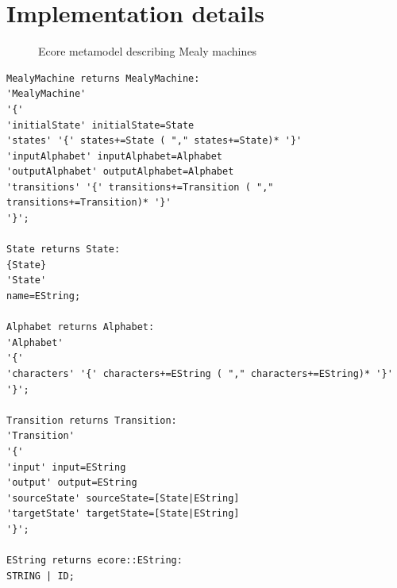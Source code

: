 \clearpage
\chapter{Implementation details}

\begin{figure}[!ht] 
	\centering
	\caption{Ecore metamodel describing Mealy machines} 
	\label{fig_appendix_mealyecor}
\end{figure}

\begin{lstlisting}[caption=Xtext grammar describing Mealy machines.,label=li:appendix_xtext,float,floatplacement=H]
MealyMachine returns MealyMachine:
'MealyMachine'
'{'
'initialState' initialState=State
'states' '{' states+=State ( "," states+=State)* '}' 
'inputAlphabet' inputAlphabet=Alphabet
'outputAlphabet' outputAlphabet=Alphabet
'transitions' '{' transitions+=Transition ( "," transitions+=Transition)* '}' 
'}';

State returns State:
{State}
'State'
name=EString;

Alphabet returns Alphabet:
'Alphabet'
'{'
'characters' '{' characters+=EString ( "," characters+=EString)* '}' 
'}';

Transition returns Transition:
'Transition'
'{'
'input' input=EString
'output' output=EString
'sourceState' sourceState=[State|EString]
'targetState' targetState=[State|EString]
'}';

EString returns ecore::EString:
STRING | ID;
\end{lstlisting}

